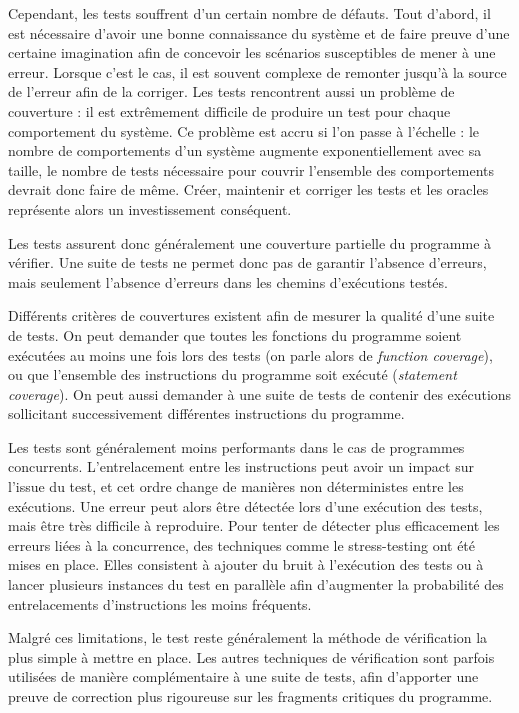 Cependant, les tests souffrent d'un certain nombre de
défauts. Tout d'abord, il est nécessaire d'avoir une bonne connaissance
du système et de faire preuve d'une certaine imagination afin de
concevoir les scénarios susceptibles de mener à une erreur. Lorsque
c'est le cas, il est souvent complexe de remonter jusqu'à la source de
l'erreur afin de la corriger. Les tests rencontrent aussi un problème de
couverture : il est extrêmement difficile de produire un test pour
chaque comportement du système. Ce problème est accru si l'on passe à
l'échelle : le nombre de comportements d'un système augmente
exponentiellement avec sa taille, le nombre de tests nécessaire pour
couvrir l'ensemble des comportements devrait donc faire de même. Créer, maintenir et
corriger les tests et les oracles représente alors un investissement conséquent.

Les tests assurent donc généralement une couverture partielle du
programme à vérifier. Une suite de tests ne permet donc pas de garantir
l'absence d'erreurs, mais seulement l'absence d'erreurs dans les chemins
d'exécutions testés.

Différents critères de couvertures existent afin de mesurer la qualité
d'une suite de tests. On peut demander que toutes les fonctions du
programme soient exécutées au moins une fois lors des tests (on parle
alors de \emph{function coverage}), ou que l'ensemble des instructions
du programme soit exécuté (\emph{statement coverage}). On peut aussi
demander à une suite de tests de contenir des exécutions sollicitant
successivement différentes instructions du programme.

Les tests sont généralement moins performants dans le cas de programmes
concurrents. L'entrelacement entre les instructions peut avoir un impact
sur l'issue du test, et cet ordre change de manières non déterministes
entre les exécutions. Une erreur peut alors être détectée lors d'une
exécution des tests, mais être très difficile à reproduire. Pour tenter
de détecter plus efficacement les erreurs liées à la concurrence, des
techniques comme le stress-testing ont été mises en place. Elles
consistent à ajouter du bruit à l'exécution des tests ou à lancer
plusieurs instances du test en parallèle afin d'augmenter la probabilité
des entrelacements d'instructions les moins fréquents.

Malgré ces limitations, le test reste généralement la méthode de
vérification la plus simple à mettre en place. Les autres techniques de
vérification sont parfois utilisées de manière complémentaire à une
suite de tests, afin d'apporter une preuve de correction plus rigoureuse
sur les fragments critiques du programme.

